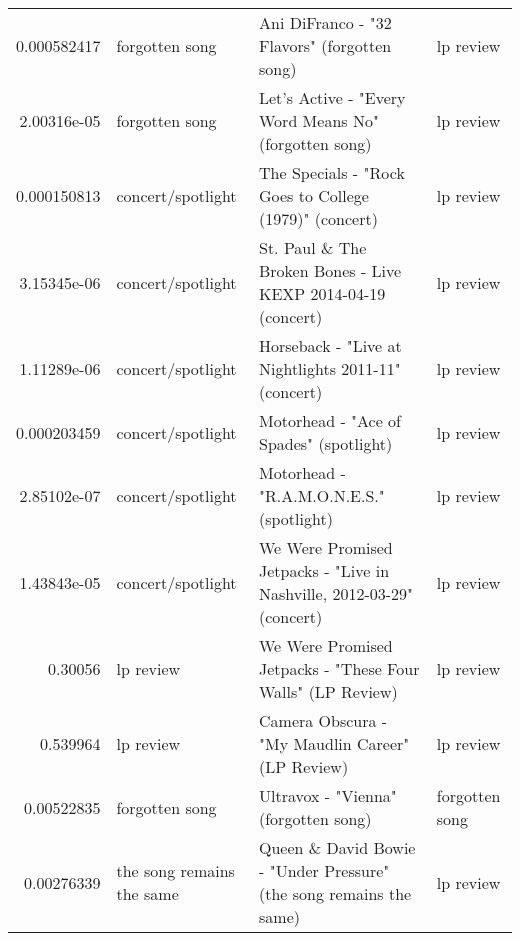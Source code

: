 \documentclass[letterpaper,10pt]{article}
\begin{document}
\begin{table}[H]
\begin{adjustbox}{max width=\linewidth}
\begin{tabular}{rlll}
  0.000582417 & forgotten song            & Ani DiFranco - "32 Flavors" (forgotten song)                                                                 & lp review                 \\
  2.00316e-05 & forgotten song            & Let's Active - "Every Word Means No" (forgotten song)                                                        & lp review                 \\
  0.000150813 & concert/spotlight         & The Specials - "Rock Goes to College (1979)" (concert)                                                       & lp review                 \\
  3.15345e-06 & concert/spotlight         & St. Paul \& The Broken Bones - Live KEXP 2014-04-19 (concert)                                                 & lp review                 \\
  1.11289e-06 & concert/spotlight         & Horseback - "Live at Nightlights 2011-11" (concert)                                                          & lp review                 \\
  0.000203459 & concert/spotlight         & Motorhead - "Ace of Spades" (spotlight)                                                                      & lp review                 \\
  2.85102e-07 & concert/spotlight         & Motorhead - "R.A.M.O.N.E.S." (spotlight)                                                                     & lp review                 \\
  1.43843e-05 & concert/spotlight         & We Were Promised Jetpacks - "Live in Nashville, 2012-03-29" (concert)                                        & lp review                 \\
  0.30056     & lp review                 & We Were Promised Jetpacks - "These Four Walls" (LP Review)                                                   & lp review                 \\
  0.539964    & lp review                 & Camera Obscura - "My Maudlin Career" (LP Review)                                                             & lp review                 \\
  0.00522835  & forgotten song            & Ultravox - "Vienna" (forgotten song)                                                                         & forgotten song            \\
  0.00276339  & the song remains the same & Queen \& David Bowie - "Under Pressure" (the song remains the same)                                           & lp review                 \\

\end{tabular}
\end{adjustbox}
\end{table}
\end{document}
